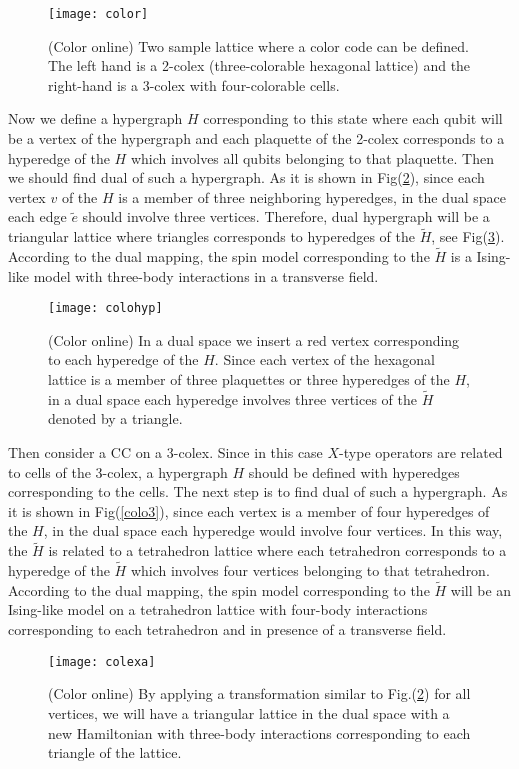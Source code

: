 \documentclass[preprintnumbers, showpacs, floatfix,twocolumn,
preprintnumbers, superscriptaddress]{revtex4}
\begin{document}
\begin{figure}[t]
\centering
\texttt{[image: color]}
\caption{(Color online) Two sample lattice where a color code can be defined. The left hand is a 2-colex (three-colorable hexagonal lattice) and the right-hand is a 3-colex with four-colorable cells. } \label{color}
\end{figure}
Now we define a hypergraph $H$ corresponding to this state where
each qubit will be a vertex of the hypergraph and each plaquette
of the 2-colex corresponds to a hyperedge of the $H$ which
involves all qubits belonging to that plaquette. Then we should
find dual of such a hypergraph. As it is shown in
Fig(\ref{colohyp}), since each vertex $v$ of the $H$ is a member
of three neighboring hyperedges, in the dual space each edge
$\tilde{e}$ should involve three vertices. Therefore, dual
hypergraph will be a triangular lattice where triangles
corresponds to hyperedges of the $\tilde{H}$, see
Fig(\ref{colexa}). According to the dual mapping, the spin model
corresponding to the $\tilde{H}$ is a Ising-like model with
three-body interactions in a transverse field.
\begin{figure}[t]
\centering
\texttt{[image: colohyp]}
\caption{(Color online) In a dual space we insert a red vertex corresponding to each hyperedge of the $H$. Since each vertex of the hexagonal lattice is a member of three plaquettes or three hyperedges of the $H$, in a dual space each hyperedge involves three vertices of the $\tilde{H}$ denoted by a triangle.} \label{colohyp}
\end{figure}
Then consider a CC on a 3-colex. Since in this case $X$-type operators are related to cells of the 3-colex, a hypergraph $H$ should be defined with hyperedges corresponding to the cells. The next step is to find dual of such a hypergraph. As it is shown in Fig(\ref{colo3}), since each vertex is a member of four hyperedges of the $H$, in the dual space each hyperedge would involve four vertices. In this way, the $\tilde{H}$ is related to a tetrahedron lattice where each tetrahedron corresponds to a hyperedge of the $\tilde{H}$ which involves four vertices belonging to that tetrahedron. According to the dual mapping, the spin model corresponding to the $\tilde{H}$ will be an Ising-like model on a tetrahedron lattice with four-body interactions corresponding to each tetrahedron and in presence of a transverse field.
\begin{figure}[t]
\centering
\texttt{[image: colexa]}
\caption{(Color online) By applying a transformation similar to
Fig.(\ref{colohyp}) for all vertices, we will have a triangular
lattice in the dual space with a new Hamiltonian with three-body
interactions corresponding to each triangle of the lattice.}
\label{colexa}
\end{figure}
\end{document}
